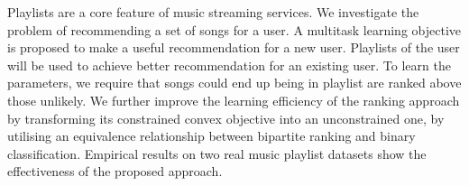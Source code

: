 Playlists are a core feature of music streaming services.
We investigate the problem of recommending a set of songs for a user.
A multitask learning objective is proposed to make a useful recommendation for a new user.
Playlists of the user will be used to achieve better recommendation for an existing user.
To learn the parameters, we require that songs could end up being in playlist are ranked above those unlikely.
We further improve the learning efficiency of the ranking approach by transforming its
constrained convex objective into an unconstrained one,
by utilising an equivalence relationship between bipartite ranking and binary classification.
Empirical results on two real music playlist datasets show the effectiveness of the proposed approach.
